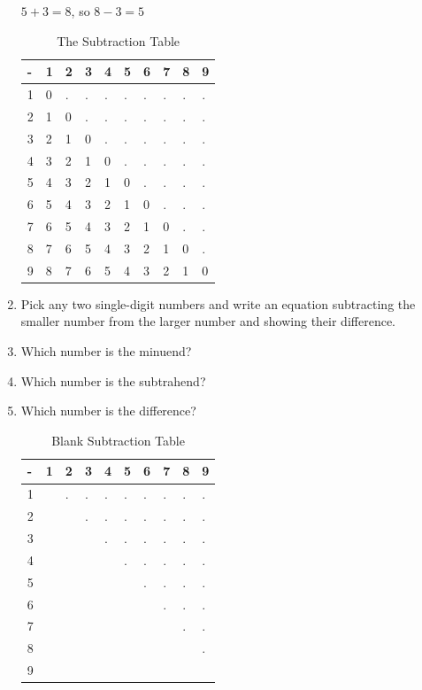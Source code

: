 \documentclass[12pt]{article}
\begin{document}
\begin{enumerate}
\begin{center}
$5 + 3 = 8$, so $8 - 3 = 5$
\end{center}

\begin{table}[h]
\centering
\begin{tabular}{|l|l|l|l|l|l|l|l|l|l|}
\hline
- & 1 & 2 & 3 & 4 & 5 & 6 & 7 & 8 & 9 \\ \hline
1 & 0 & . & . & . & . & . & . & . & . \\ \hline
2 & 1 & 0 & . & . & . & . & . & . & . \\ \hline
3 & 2 & 1 & 0 & . & . & . & . & . & . \\ \hline
4 & 3 & 2 & 1 & 0 & . & . & . & . & . \\ \hline
5 & 4 & 3 & 2 & 1 & 0 & . & . & . & . \\ \hline
6 & 5 & 4 & 3 & 2 & 1 & 0 & . & . & . \\ \hline
7 & 6 & 5 & 4 & 3 & 2 & 1 & 0 & . & . \\ \hline
8 & 7 & 6 & 5 & 4 & 3 & 2 & 1 & 0 & . \\ \hline
9 & 8 & 7 & 6 & 5 & 4 & 3 & 2 & 1 & 0 \\ \hline
\end{tabular}
\caption*{The Subtraction Table}
\end{table}

\item Pick any two single-digit numbers and write an equation subtracting the smaller number from the larger number and showing their difference.
\item Which number is the minuend?
\item Which number is the subtrahend?
\item Which number is the difference?

\begin{table}[ht]
\centering
\begin{tabular}{|l|l|l|l|l|l|l|l|l|l|}
\hline
- & 1 & 2 & 3 & 4 & 5 & 6 & 7 & 8 & 9 \\ \hline
1 &  & . & . & . & . & . & . & . & . \\ \hline
2 &  &  & . & . & . & . & . & . & . \\ \hline
3 &  &  &  & . & . & . & . & . & . \\ \hline
4 &  &  &  &  & . & . & . & . & . \\ \hline
5 &  &  &  &  &  & . & . & . & . \\ \hline
6 &  &  &  &  &  &  & . & . & . \\ \hline
7 &  &  &  &  &  &  &  & . & . \\ \hline
8 &  &  &  &  &  &  &  &  & . \\ \hline
9 &  &  &  &  &  &  &  &  &  \\ \hline
\end{tabular}
\caption*{Blank Subtraction Table}
\end{table}


\end{enumerate}
\end{document}
